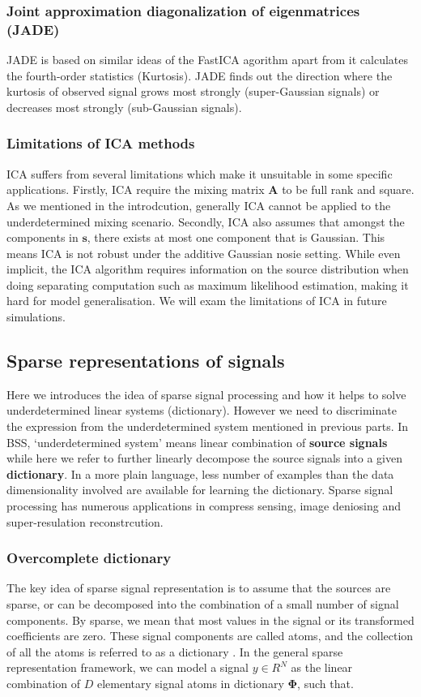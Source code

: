 \subsubsection{Joint approximation diagonalization of
eigenmatrices (JADE)}
JADE is based on similar ideas of the FastICA agorithm apart from it calculates the fourth-order statistics (Kurtosis). JADE finds out the direction where the kurtosis of observed signal grows most strongly (super-Gaussian signals) or decreases most strongly (sub-Gaussian signals).

\subsubsection{Limitations of ICA methods}
\label{ica_defect}
ICA suffers from several limitations which make it unsuitable in some specific applications. Firstly, ICA require the mixing matrix $\mathbf{A}$ to be full rank and square. As we mentioned in the introdcution, generally ICA cannot be applied to the underdetermined mixing scenario. Secondly, ICA also assumes that amongst the components in $\mathbf{s}$, there exists at most one component that is Gaussian. This means ICA is not robust under the additive Gaussian nosie setting. While even implicit, the ICA algorithm requires information on the source distribution when doing separating computation such as maximum likelihood estimation, making it hard for model generalisation. We will exam the limitations of ICA in future simulations.

\subsection{Sparse representations of signals}
Here we introduces the idea of sparse signal processing and how it helps to solve underdetermined linear systems (dictionary). However we need to discriminate the expression from the underdetermined system mentioned in previous parts. In BSS, `underdetermined system' means linear combination of \textbf{source signals} while here we refer to further linearly decompose the source signals into a given \textbf{dictionary}. In a more plain language, less number of examples than the data dimensionality involved are available for learning the dictionary. Sparse signal processing has numerous applications in compress sensing, image deniosing and super-resulation reconstrcution.

\subsubsection{Overcomplete dictionary}
\label{over_dict}
The key idea of sparse signal representation is to assume
that the sources are sparse, or can be decomposed into the
combination of a small number of signal components. By
sparse, we mean that most values in the signal or its transformed coefficients are zero. These signal components are called atoms, and the collection of all the atoms is referred to as a dictionary \cite{Mallat_Zhang1993}. In the general sparse representation framework, we can model a signal $y \in R^N$ as the linear combination of $D$ elementary signal atoms in dictionary $\mathbf{\Phi}$, such that.

